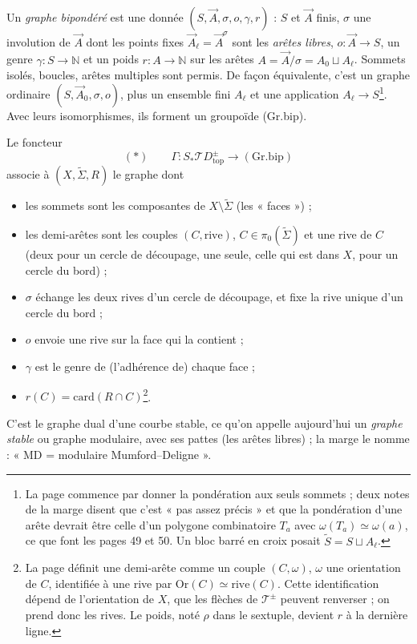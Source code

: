 \documentclass[11pt,a4paper]{article}
\begin{document}
Un \emph{graphe bipondéré} est une donnée $(S, \vec{A}, \sigma, o, \gamma, r)$ :
$S$ et $\vec{A}$ finis, $\sigma$ une involution de $\vec{A}$ dont les points
fixes $\vec{A}_\ell = \vec{A}^{\sigma}$ sont les \emph{arêtes libres}, $o :
\vec{A} \to S$, un genre $\gamma : S \to \mathbb{N}$ et un poids $r : A \to
\mathbb{N}$ sur les arêtes $A = \vec{A}/\sigma = A_0 \sqcup A_\ell$. Sommets
isolés, boucles, arêtes multiples sont permis. De façon équivalente, c'est un
graphe ordinaire $(S, \vec{A}_0, \sigma, o)$, plus un ensemble fini $A_\ell$
et une application $A_\ell \to S$\footnote{La page commence par donner la
pondération aux seuls sommets ; deux notes de la marge disent que c'est « pas
assez précis » et que la pondération d'une arête devrait être celle d'un polygone
combinatoire $T_a$ avec $\omega(T_a) \simeq \omega(a)$, ce que font les pages 49
et 50. Un bloc barré en croix posait $\widetilde{S} = S \sqcup A_\ell$.}. Avec
leurs isomorphismes, ils forment un groupoïde (Gr.bip).

Le foncteur
\[
(*)\qquad \Gamma : S_{*}\mathcal{T}D^{\pm}_{\mathrm{top}} \longrightarrow
(\mathrm{Gr.bip})
\]
associe à $(X, \widetilde{\Sigma}, R)$ le graphe dont
\begin{itemize}
\item les sommets sont les composantes de $X \setminus \widetilde{\Sigma}$ (les
« faces ») ;
\item les demi-arêtes sont les couples $(C, \text{rive})$, $C \in
\pi_0(\widetilde{\Sigma})$ et une rive de $C$ (deux pour un cercle de découpage,
une seule, celle qui est dans $X$, pour un cercle du bord) ;
\item $\sigma$ échange les deux rives d'un cercle de découpage, et fixe la rive
unique d'un cercle du bord ;
\item $o$ envoie une rive sur la face qui la contient ;
\item $\gamma$ est le genre de (l'adhérence de) chaque face ;
\item $r(C) = \mathrm{card}(R \cap C)$\footnote{La page définit une demi-arête
comme un couple $(C, \omega)$, $\omega$ une orientation de $C$, identifiée à une
rive par $\mathrm{Or}(C) \simeq \mathrm{rive}(C)$. Cette identification dépend de
l'orientation de $X$, que les flèches de $\mathcal{T}^{\pm}$ peuvent renverser ; on
prend donc les rives. Le poids, noté $\rho$ dans le sextuple, devient $r$ à la
dernière ligne.}.
\end{itemize}
C'est le graphe dual d'une courbe stable, ce qu'on appelle aujourd'hui un
\emph{graphe stable} ou graphe modulaire, avec ses pattes (les arêtes libres) ;
la marge le nomme : « MD = modulaire Mumford–Deligne ».
\end{document}
